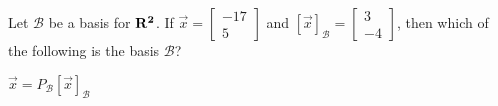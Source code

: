 \documentclass{ximera}
\newcommand{\RR}{\bf R}
\begin{document}
  		    \begin{question}
  		    Let $\mathcal{B}$ be a basis for $\RR^2$. If $\vec{x} = \begin{bmatrix} -17\\ 5\end{bmatrix}$ and $[\vec{x}]_{\mathcal{B}} = \begin{bmatrix} 3\\ -4\end{bmatrix}$, then which of the following is the basis $\mathcal{B}$?\\
  		    \begin{multipleChoice}
  		    	\end{multipleChoice}
  		    	
  		    		\begin{hint} $\vec{x} = P_{\mathcal{B}} [\vec{x}]_{\mathcal{B}}$
  		    		\end{hint}
  		    \end{question}	
     
  
\end{document}
